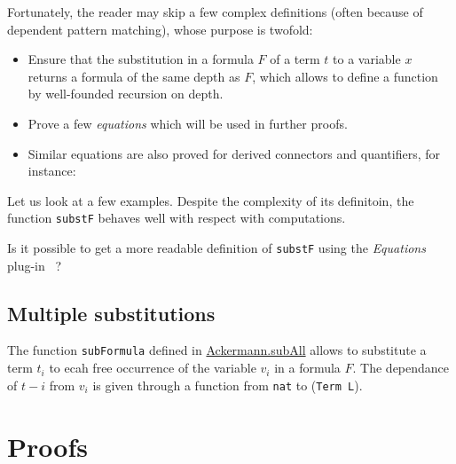Fortunately, the reader may skip a few complex definitions 
(often because of dependent pattern matching), whose purpose
is twofold:
\begin{itemize}
\item Ensure that the substitution in a formula $F$ of a term $t$ to a variable $x$ returns a formula of the same depth as $F$,
  which allows to define a function by well-founded recursion on depth.
\item Prove a few \emph{equations} which will be used in further proofs.


\item Similar equations are also proved for derived connectors and quantifiers, for instance:


\end{itemize}

Let us look at a few examples. Despite the complexity of its definitoin, the function \texttt{substF} behaves well with respect with computations.


\begin{project}
  Is it possible to get a more readable definition of \texttt{substF} using the \emph{Equations} plug-in~\cite{sozeau:hal-01671777} ? 
\end{project}




\subsection{Multiple substitutions}

The function \texttt{subFormula} defined in
\href{../theories/html/hydras.Ackermann.subAll.html}{Ackermann.subAll} allows to substitute a term $t_i$ to ecah free occurrence of the variable $v_i$ in a formula $F$. The dependance of $t-i$ from $v_i$ is given through a function from \texttt{nat} to
(\texttt{Term L}).




\section{Proofs}

